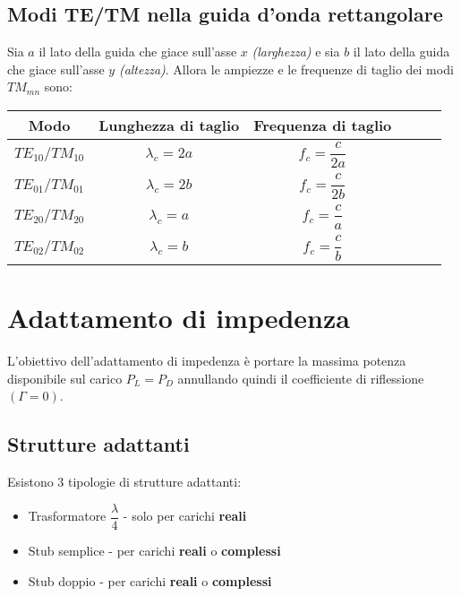 \documentclass{article}
\begin{document}
\subsection{Modi TE/TM nella guida d'onda rettangolare}
Sia \(a\) il lato della guida che giace sull'asse \(x\) \textit{(larghezza)} e sia \(b\) il lato della guida che giace sull'asse \(y\) \textit{(altezza)}. Allora le ampiezze e le frequenze di taglio dei modi \(TM_{mn} \) sono:
\vspace{15pt}
\begin{center}
	\begin{tabular}{|Sc|Sc|Sc|}
		\hline 
		Modo & Lunghezza di taglio & Frequenza di taglio \\ 
		\hline 	
		\(TE_{10} / TM_{10}\) & \(\lambda_c = 2a\) & \(f_c = \dfrac{c}{2a}\) \\ 
		\hline 
		\(TE_{01} / TM_{01}\) & \(\lambda_c = 2b\) & \(f_c = \dfrac{c}{2b}\) \\ 
		\hline 
		\(TE_{20} / TM_{20}\) & \(\lambda_c = a\) & \(f_c = \dfrac{c}{a}\) \\ 
		\hline 
		\(TE_{02} / TM_{02}\) & \(\lambda_c = b\) & \(f_c = \dfrac{c}{b}\) \\ 
		\hline 
	\end{tabular} 
\end{center}
\vspace{5pt}

\newpage

\section{Adattamento di impedenza}
L'obiettivo dell'adattamento di impedenza è portare la massima potenza disponibile sul carico \(P_L = P_D\) annullando quindi il coefficiente di riflessione \( (\Gamma = 0) \).

\subsection{Strutture adattanti}
Esistono 3 tipologie di strutture adattanti:\
\begin{itemize}
	\item Trasformatore \( \dfrac{\lambda}{4} \) - solo per carichi \textbf{reali}
	\item Stub semplice - per carichi \textbf{reali} o \textbf{complessi}
	\item Stub doppio - per carichi \textbf{reali} o \textbf{complessi}
\end{itemize}
\end{document}
